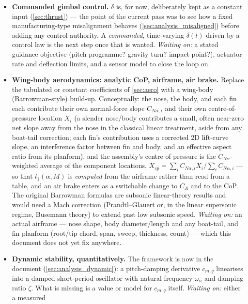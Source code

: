 \documentclass[10pt]{extarticle}
\numberwithin{equation}{subsection}
\begin{document}
\begin{itemize}
    \item \textbf{Commanded gimbal control.} $\delta$ is, for now, deliberately kept as a constant
    input (\autoref{sec:thrust}) --- the point of the current pass was to see how a fixed
    manufacturing-type misalignment behaves (\autoref{sec:analysis_misaligned}) before adding any
    control authority. A \emph{commanded}, time-varying $\delta(t)$ driven by a control law is the
    next step once that is wanted. \emph{Waiting on:} a stated guidance objective (pitch
    programme? gravity turn? impact point?), actuator rate and deflection limits, and a sensor
    model to close the loop on.
    \item \textbf{Wing-body aerodynamics: analytic CoP, airframe, air brake.} Replace the
    tabulated or constant coefficients of \autoref{sec:aero} with a wing-body (Barrowman-style)
    build-up. Conceptually: the nose, the body, and each fin each contribute their own normal-force
    slope $C_{N\alpha,i}$ and their own centre-of-pressure location $X_i$ (a slender
    nose/body contributes a small, often near-zero net slope away from the nose in the classical
    linear treatment, aside from any boat-tail correction; each fin's contribution uses a
    corrected 2D lift-curve slope, an interference factor between fin and body, and an
    effective aspect ratio from its planform), and the assembly's centre of pressure is the
    $C_{N\alpha}$-weighted average of the component locations,
    $X_{cp}=\sum_iC_{N\alpha,i}X_i/\sum_iC_{N\alpha,i}$ --- so that $l_1(\alpha,M)$ is
    \emph{computed} from the airframe rather than read from a table, and an air brake enters as a
    switchable change to $C_A$ and to the CoP. The original Barrowman formulas are subsonic
    linear-theory results and would need a Mach correction (Prandtl--Glauert or, in the linear
    supersonic regime, Busemann theory) to extend past low subsonic speed.
    \emph{Waiting on:} an actual airframe --- nose shape, body diameter/length and any boat-tail,
    and fin planform (root/tip chord, span, sweep, thickness, count) --- which this document does
    not yet fix anywhere.
    \item \textbf{Dynamic stability, quantitatively.} The framework is now in the document
    (\autoref{sec:analysis_dynamic}): a pitch-damping derivative $c_{m,q}$ linearises into a
    damped short-period oscillator with natural frequency $\omega_n$ and damping ratio $\zeta$.
    What is missing is a value or model for $c_{m,q}$ itself. \emph{Waiting on:} either a measured

\end{itemize}
\end{document}
